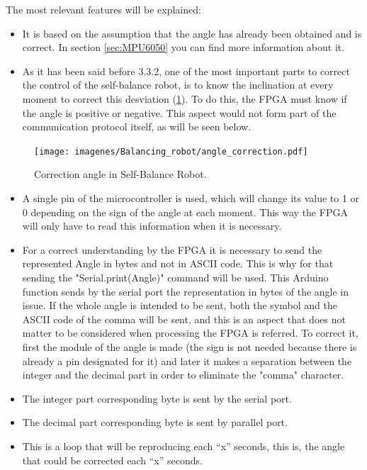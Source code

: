 The most relevant features will be explained: 

\begin{itemize}
	\item It is based on the assumption that the angle has already been obtained and is correct. In section \ref{sec:MPU6050} you can find more information about it.
	\item As it has been said before 3.3.2, one of the most important parts to correct the control of the self-balance robot, is to know the inclination at every moment to correct this desviation (\ref{fig:angle_correction}). To do this, the FPGA must know if the angle is positive or negative. This aspect would not form part of the communication protocol itself, as will be seen below. 
\end{itemize}
	
	\begin{figure}[H]
		\center
		\texttt{[image: imagenes/Balancing\_robot/angle\_correction.pdf]}
		\caption{Correction angle in Self-Balance Robot.}
		\label{fig:angle_correction}
	\end{figure}
	
\begin{itemize}	
	\item A single pin of the microcontroller is used, which will change its value to 1 or 0 depending on the sign of the angle at each moment. This way the FPGA will only have to read this information when it is necessary.
	
	\item For a correct understanding by the FPGA it is necessary to send the represented Angle in bytes and not in ASCII code. This is why for that sending the "Serial.print(Angle)" command will be used. This Arduino function sends by the serial port the representation in bytes of the angle in issue.\newline
	If the whole angle is intended to be sent, both the symbol and the ASCII code of the comma will be sent, and this is an aspect that does not matter to be considered when processing the FPGA is referred. To correct it, first the module of the angle is made (the sign is not needed because there is already a pin designated for it) and later it makes a separation between the integer and the decimal part in order to eliminate the "comma" character.
	\item The integer part corresponding byte is sent by the serial port.
	\item The decimal part corresponding byte is sent by parallel port.
	\item This is a loop that will be reproducing each “x” seconds, this is, the angle that could be corrected each “x” seconds. 
\end{itemize}


